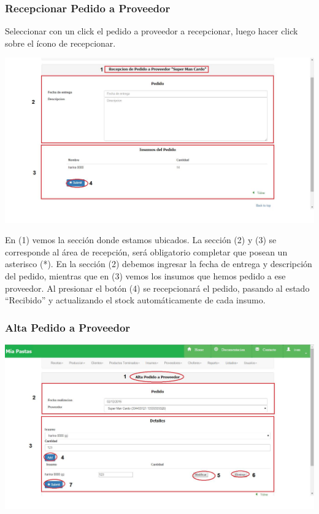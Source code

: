 \documentclass[letterpaper,10pt,english]{sphinxmanual}
\begin{document}
\subsubsection{Recepcionar Pedido a Proveedor}
\label{pedidosProveedor:recepcionar-pedido-a-proveedor}
Seleccionar con un click el pedido a proveedor a recepcionar, luego hacer click sobre el ícono de recepcionar.

\includegraphics{pedidos_recepcionar.jpg}

En (1) vemos la sección donde estamos ubicados. La sección (2) y (3) se corresponde al área de recepción, será obligatorio completar que posean un asterisco (*).  En la sección (2) debemos ingresar la fecha de entrega y descripción del pedido, mientras que en (3) vemos los insumos que hemos pedido a ese proveedor. Al presionar el botón (4) se recepcionará el pedido, pasando al estado “Recibido” y actualizando el stock automáticamente de cada insumo.


\subsubsection{Alta Pedido a Proveedor}
\label{pedidosProveedor:alta-pedido-a-proveedor}
\includegraphics{pedidos_alta.jpg}
\end{document}
